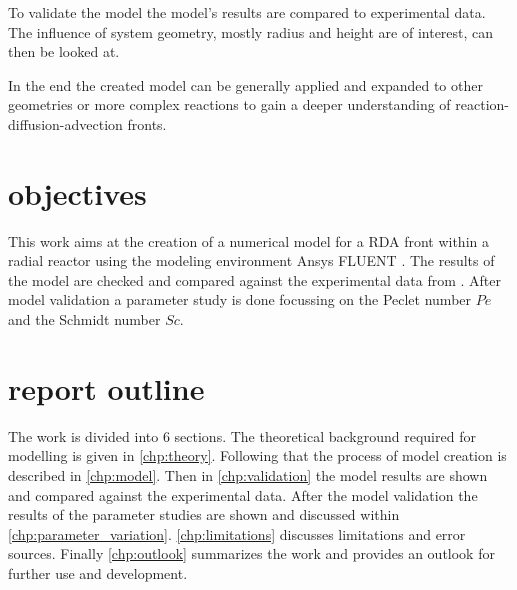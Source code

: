 \documentclass[../thesis.tex]{subfiles}
\begin{document}
To validate the model the model's results are compared to experimental data. The influence of system geometry, mostly radius and height are of interest, can then be looked at. 

In the end the created model can be generally applied and expanded to other geometries or more complex reactions to gain a deeper understanding of reaction-diffusion-advection fronts. 

\section{objectives}

This work aims at the creation of a numerical model for a RDA front within a radial reactor using the modeling environment Ansys FLUENT \cite{}. The results of the model are checked and compared against the experimental data from \cite{stergiou2022effects}. After model validation a parameter study is done focussing on the Peclet number $Pe$ and the Schmidt number $Sc$.


\section{report outline}

The work is divided into 6 sections. The theoretical background required for modelling is given in \autoref{chp:theory}. Following that the process of model creation is described in \autoref{chp:model}. Then in \autoref{chp:validation} the model results are shown and compared against the experimental data. After the model validation the results of the parameter studies are shown and discussed within \autoref{chp:parameter_variation}. \autoref{chp:limitations} discusses limitations and error sources. Finally \autoref{chp:outlook} summarizes the work and provides an outlook for further use and development.
\end{document}
